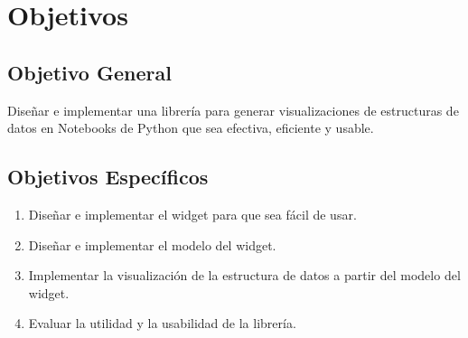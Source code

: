 \section{Objetivos}

\subsection*{Objetivo General}\label{sec:obj-g}

Diseñar e implementar una librería para generar visualizaciones de estructuras de datos en Notebooks de Python que sea efectiva, eficiente y usable.

\subsection*{Objetivos Específicos}\label{sec:obj-e}

\begin{enumerate}
  \item Diseñar e implementar el widget para que sea fácil de usar.
  \item Diseñar e implementar el modelo del widget.
  \item Implementar la visualización de la estructura de datos a partir del modelo del widget.
  \item Evaluar la utilidad y la usabilidad de la librería.
\end{enumerate}
